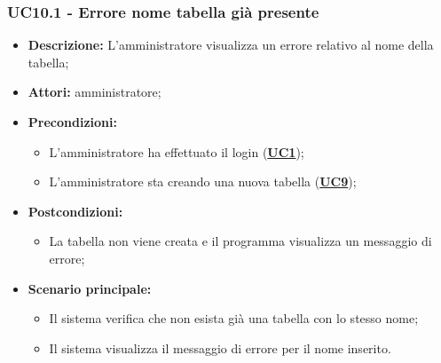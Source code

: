 \subsubsection{UC10.1 - Errore nome tabella già presente}
\label{sec:UC10.1}
\begin{itemize}
	\item \textbf{Descrizione:} L’amministratore visualizza un errore relativo al nome della tabella;
	\item \textbf{Attori:} amministratore;
	\item \textbf{Precondizioni:} 
	\begin{itemize}
		\item L’amministratore ha effettuato il login (\hyperref[sec:UC1]{\textbf{UC1}});
		\item L’amministratore sta creando una nuova tabella (\hyperref[sec:UC9]{\textbf{UC9}});
	\end{itemize}
	\item \textbf{Postcondizioni:} 
	\begin{itemize}
		\item La tabella non viene creata e il programma visualizza un messaggio di errore;
	\end{itemize}
	\item \textbf{Scenario principale:} 
	\begin{itemize}
		\item Il sistema verifica che non esista già una tabella con lo stesso nome;
		\item Il sistema visualizza il messaggio di errore per il nome inserito.
	\end{itemize}
\end{itemize}

